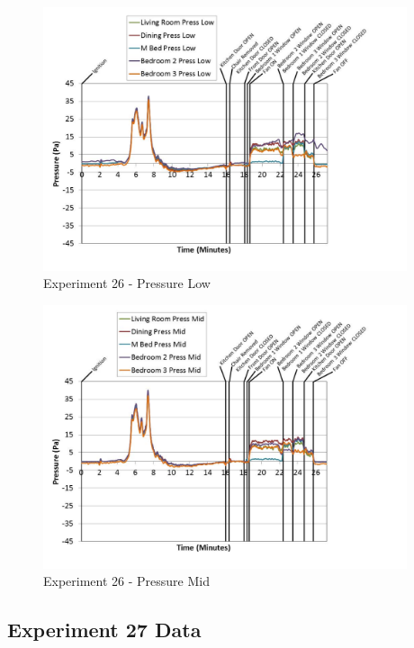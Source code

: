 \documentclass{article}
\begin{document}
\begin{appendices}
	\clearpage

	\begin{figure}[h!]
		\centering
		\includegraphics[height=3.05in]{0_Images/Results_Charts/Exp_26_Charts/PressureLow.pdf}
		\caption{Experiment 26 - Pressure Low}
	\end{figure}
 

	\begin{figure}[h!]
		\centering
		\includegraphics[height=3.05in]{0_Images/Results_Charts/Exp_26_Charts/PressureMid.pdf}
		\caption{Experiment 26 - Pressure Mid}
	\end{figure}
 
	\clearpage

		\clearpage
\clearpage		\large
\subsection{Experiment 27 Data} \label{App:Exp27Results} 


\end{appendices}
\end{document}
